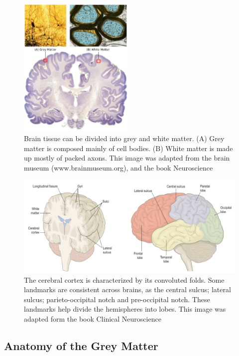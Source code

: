 \begin{figure}[t!]
    \includegraphics[width=0.49\textwidth]{2.neuroanatomy/img/white_vs_gray.png}
    \caption{Brain tissue can be divided into grey and white matter. (A) Grey matter
             is composed mainly of cell bodies. (B) White matter is made up mostly
             of packed axons. This image was adapted from the brain museum (www.brainmuseum.org),
             and the book Neuroscience\cite{Purves2004}}
    \label{fig:white_grey_matter}
\end{figure}

\begin{figure}[t]
    \includegraphics[width=\textwidth]{2.neuroanatomy/img/lobes.png}
    \caption{The cerebral cortex is characterized by its convoluted folds.
             Some landmarks are consistent across brains, as the central sulcus;
             lateral sulcus; parieto-occipital notch and pre-occipital notch.
             These landmarks help divide the hemispheres into lobes. This image
             was adapted form the book Clinical Neuroscience\cite{Johns}}
    \label{fig:cortex_anatomy}
\end{figure}

\subsection{Anatomy of the Grey Matter}

